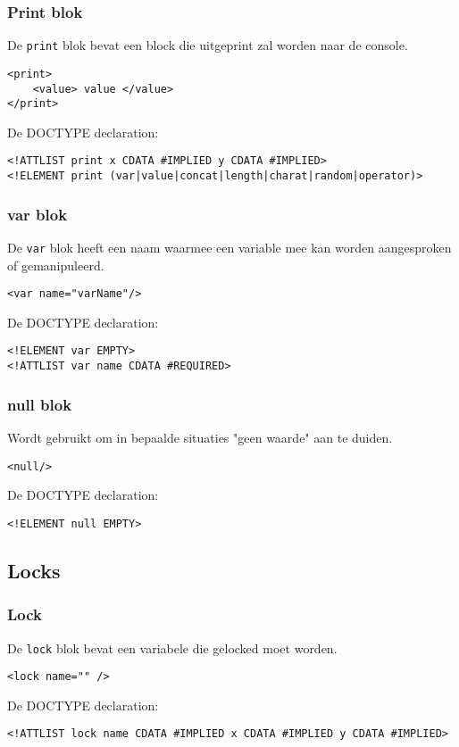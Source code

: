 \documentclass[]{article}
\begin{document}
\subsubsection{Print blok}
De \texttt{print} blok bevat een block die uitgeprint zal worden naar de console.
\lstset{language=XML}
\begin{lstlisting}
<print>
	<value> value </value>
</print>
\end{lstlisting}
De DOCTYPE declaration: 
\lstset{language=XML}
\begin{lstlisting}
<!ATTLIST print x CDATA #IMPLIED y CDATA #IMPLIED>
<!ELEMENT print (var|value|concat|length|charat|random|operator)>
\end{lstlisting}
\subsubsection{var blok}
De \texttt{var} blok heeft een naam waarmee een variable mee kan worden aangesproken of gemanipuleerd.
\lstset{language=XML}
\begin{lstlisting}
<var name="varName"/>
\end{lstlisting}
De DOCTYPE declaration: 
\lstset{language=XML}
\begin{lstlisting}
<!ELEMENT var EMPTY>
<!ATTLIST var name CDATA #REQUIRED>
\end{lstlisting}

\subsubsection{null blok}
Wordt gebruikt om in bepaalde situaties "geen waarde" aan te duiden.
\lstset{language=XML}
\begin{lstlisting}
<null/>
\end{lstlisting}
De DOCTYPE declaration: 
\lstset{language=XML}
\begin{lstlisting}
<!ELEMENT null EMPTY>
\end{lstlisting}

\subsection{Locks}
\subsubsection{Lock}
De \texttt{lock} blok bevat een variabele die gelocked moet worden.	
\lstset{language=XML}
\begin{lstlisting}
<lock name="" />
\end{lstlisting}
De DOCTYPE declaration: 
\lstset{language=XML}
\begin{lstlisting}
<!ATTLIST lock name CDATA #IMPLIED x CDATA #IMPLIED y CDATA #IMPLIED>
\end{lstlisting}
\end{document}
